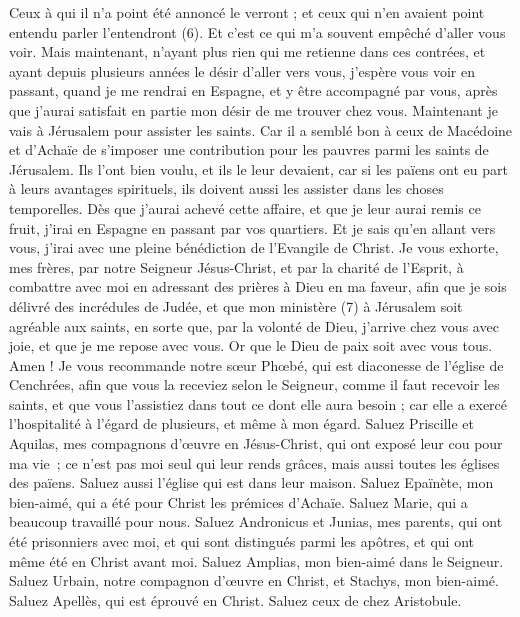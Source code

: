 \begin{multicols}{2}
Ceux à qui il n'a point été annoncé le verront ; et ceux qui n'en avaient point entendu parler l’entendront (6).
Et c’est ce qui m'a souvent empêché d’aller vous voir.
Mais maintenant, n’ayant plus rien qui me retienne dans ces contrées, et ayant depuis plusieurs années le désir d’aller vers vous,
j’espère vous voir en passant, quand je me rendrai en Espagne, et y être accompagné par vous, après que j’aurai satisfait en partie mon désir de me trouver chez vous.
Maintenant je vais à Jérusalem pour assister les saints.
Car il a semblé bon à ceux de Macédoine et d’Achaïe de s’imposer une contribution pour les pauvres parmi les saints de Jérusalem.
Ils l’ont bien voulu, et ils le leur devaient, car si les païens ont eu part à leurs avantages spirituels, ils doivent aussi les assister dans les choses temporelles.
Dès que j'aurai achevé cette affaire, et que je leur aurai remis ce fruit, j'irai en Espagne en passant par vos quartiers.
Et je sais qu’en allant vers vous, j’irai avec une pleine bénédiction de l'Evangile de Christ.
Je vous exhorte, mes frères, par notre Seigneur Jésus-Christ, et par la charité de l'Esprit, à combattre avec moi en adressant des prières à Dieu en ma faveur,
afin que je sois délivré des incrédules de Judée, et que mon ministère (7) à Jérusalem soit agréable aux saints,
en sorte que, par la volonté de Dieu, j’arrive chez vous avec joie, et que je me repose avec vous.
Or que le Dieu de paix soit avec vous tous. Amen !
\VerseOne{}Je vous recommande notre sœur Phœbé, qui est diaconesse de l'église de Cenchrées,
afin que vous la receviez selon le Seigneur, comme il faut recevoir les saints, et que vous l'assistiez dans tout ce dont elle aura besoin ; car elle a exercé l'hospitalité à l'égard de plusieurs, et même à mon égard.
Saluez Priscille et Aquilas, mes compagnons d’œuvre en Jésus-Christ,
qui ont exposé leur cou pour ma vie ; ce n’est pas moi seul qui leur rends grâces, mais aussi toutes les églises des païens.
Saluez aussi l'église qui est dans leur maison. Saluez Epaïnète, mon bien-aimé, qui a été pour Christ les prémices d'Achaïe.
Saluez Marie, qui a beaucoup travaillé pour nous.
Saluez Andronicus et Junias, mes parents, qui ont été prisonniers avec moi, et qui sont distingués parmi les apôtres, et qui ont même été en Christ avant moi.
Saluez Amplias, mon bien-aimé dans le Seigneur.
Saluez Urbain, notre compagnon d’œuvre en Christ, et Stachys, mon bien-aimé.
Saluez Apellès, qui est éprouvé en Christ. Saluez ceux de chez Aristobule.

\end{multicols}
